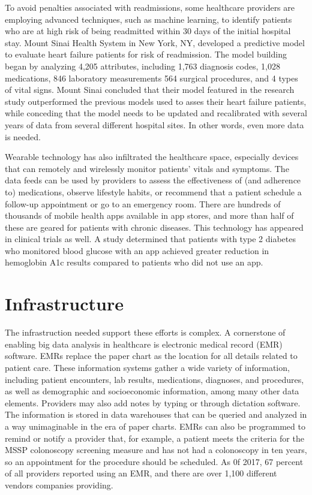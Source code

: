\documentclass[sigconf]{acmart}
\begin{document}
 To avoid penalties associated with readmissions, some healthcare providers are employing advanced techniques, such as machine learning, to identify patients who are at high risk of being readmitted within 30 days of the initial hospital stay. Mount Sinai Health System in New York, NY, developed a predictive model to evaluate heart failure patients for risk of readmission. The model building began by analyzing 4,205 attributes, including 1,763 diagnosis codes, 1,028 medications, 846 laboratory measurements 564 surgical procedures, and 4 types of vital signs\cite{editor08}. Mount Sinai concluded that their model featured in the research study outperformed the previous models used to asses their heart failure patients, while conceding that the model needs to be updated and recalibrated with several years of data from several different hospital sites. In other words, even more data is needed.

 Wearable technology has also infiltrated the healthcare space, especially devices that can remotely and wirelessly monitor patients' vitals and symptoms. The data feeds can be used by providers to assess the effectiveness of (and adherence to) medications, observe lifestyle habits, or recommend that a patient schedule a follow-up appointment or go to an emergency room\cite{editor09}. There are hundreds of thousands of mobile health apps available in app stores, and more than half of these are geared for patients with chronic diseases\cite{editor09}. This technology has appeared in clinical trials as well. A study determined that patients with type 2 diabetes who monitored blood glucose with an app achieved greater reduction in hemoglobin A1c results compared to patients who did not use an app\cite{editor10}.

\section{Infrastructure}

 The infrastruction needed support these efforts is complex. A cornerstone of enabling big data analysis in healthcare is electronic medical record (EMR) software. EMRs replace the paper chart as the location for all details related to patient care. These information systems gather a wide variety of information, including patient encounters, lab results, medications, diagnoses, and procedures, as well as demographic and socioeconomic information, among many other data elements. Providers may also add notes by typing or through dictation software. The information is stored in data warehouses that can be queried and analyzed in a way unimaginable in the era of paper charts. EMRs can also be programmed to remind or notify a provider that, for example, a patient meets the criteria for the MSSP colonoscopy screening measure and has not had a colonoscopy in ten years, so an appointment for the procedure should be scheduled. As 0f 2017, 67 percent of all providers reported using an EMR, and there are over 1,100 different vendors companies providing\cite{editor12}.
\end{document}
